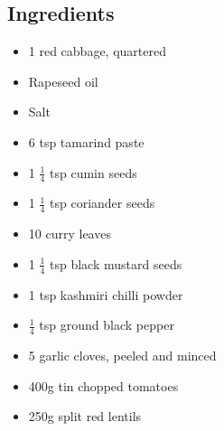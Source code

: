 \documentclass{book}
\begin{document}
\subsection*{Ingredients}
\begin{itemize}
\item 1 red cabbage, quartered
\item Rapeseed oil
\item Salt
\item 6 tsp tamarind paste
\item 1 $\frac{1}{4}$ tsp cumin seeds
\item 1 $\frac{1}{4}$ tsp coriander seeds
\item 10 curry leaves
\item 1 $\frac{1}{4}$ tsp black mustard seeds
\item 1 tsp kashmiri chilli powder
\item $\frac{1}{4}$ tsp ground black pepper
\item 5 garlic cloves, peeled and minced
\item 400g tin chopped tomatoes
\item 250g split red lentils
\end{itemize}
\end{document}

